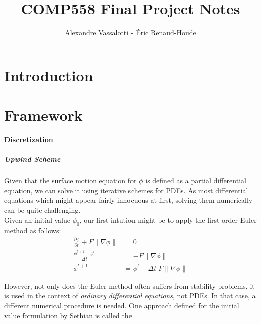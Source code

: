 \documentclass{article}
\author{Alexandre Vassalotti - \'{E}ric Renaud-Houde}
\title{COMP558 Final Project Notes}
\begin{document}
\maketitle
\setlength{\jot}{11pt}
\section{Introduction}

\section{Framework}

\paragraph{Discretization}
\subparagraph{Upwind Scheme}

Given that the surface motion equation for $\phi$ is defined as a partial differential equation, we can solve it using iterative schemes for PDEs. As most differential equations which might appear fairly innocuous at first, solving them numerically can be quite challenging. \\

 Given an initial value $\phi_0$, our first intution might be to apply the first-order Euler method as follows:
\begin{align}
    \frac{\partial \phi}{\partial t} + F \|\nabla \phi\| &= 0 \\
    \frac{\phi^{t+1} - \phi^{t}}{\Delta t} &=  -F \|\nabla \phi\| \\
    \phi^{t+1} &= \phi^{t} - \Delta t \; F \|\nabla \phi\| 
\end{align}

However, not only does the Euler method often suffers from stability problems, it is used in the context of \textit{ordinary differential equations}, not PDEs. In that case, a different numerical procedure is needed.
One approach defined for the initial value formulation by Sethian is called the 
\end{document}
